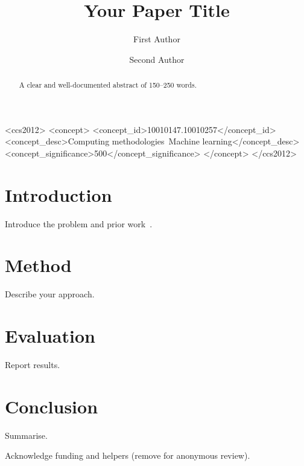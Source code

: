 \documentclass[sigconf]{acmart}
\begin{document}
\title{Your Paper Title}

\author{First Author}

\author{Second Author}

\begin{abstract}
A clear and well-documented abstract of 150--250 words.
\end{abstract}

\begin{CCSXML}
<ccs2012>
 <concept>
  <concept_id>10010147.10010257</concept_id>
  <concept_desc>Computing methodologies~Machine learning</concept_desc>
  <concept_significance>500</concept_significance>
 </concept>
</ccs2012>
\end{CCSXML}


\maketitle

\section{Introduction}
Introduce the problem and prior work~\cite{lamport1994}.

\section{Method}
Describe your approach.

\section{Evaluation}
Report results.

\section{Conclusion}
Summarise.

\begin{acks}
Acknowledge funding and helpers (remove for anonymous review).
\end{acks}



\end{document}
